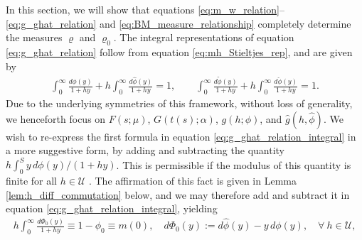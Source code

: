 \documentclass[english,12pt,jmp,graphicx]{revtex4-1}
\newcommand{\ph}{\hat{\phi}}
\newcommand{\pt}{\tilde{\phi}}
\newcommand{\pc}{\check{\phi}}
\begin{document}
In this section, we will show that equations
\eqref{eq:m_w_relation}--\eqref{eq:g_ghat_relation} and 
\eqref{eq:BM_measure_relationship} completely determine the measures
$\varrho$ and $\varrho_0$. The integral representations of equation
\eqref{eq:g_ghat_relation} follow from equation
\eqref{eq:mh_Stieltjes_rep}, and are given by  
%
\begin{align}\label{eq:g_ghat_relation_integral}
  \int_0^\infty\frac{d\phi(y)}{1+hy}+h\int_0^\infty\frac{d\ph(y)}{1+hy}=1,\qquad
  \int_0^\infty\frac{d\pt(y)}{1+hy}+h\int_0^\infty\frac{d\pc(y)}{1+hy}=1.
\end{align}
%
Due to the underlying symmetries of this framework, without loss of
generality, we henceforth focus on $F(s;\mu)$, $G(t(s);\alpha)$, $g(h;\phi)$,
and $\hat{g}(h,\ph)$. We wish to re-express the first formula in
equation \eqref{eq:g_ghat_relation_integral} in a more suggestive form,
by adding and subtracting the quantity
$h\int_0^{S}y\,d\phi(y)/(1+hy)$. This is permissible if the modulus of
this quantity is finite for all $h\in\mathcal{U}$
\cite{Rudin:87,Folland:95}. The affirmation of this fact is given in 
Lemma \ref{lem:h_diff_commutation} below, and we may therefore add and
subtract it in equation \eqref{eq:g_ghat_relation_integral}, yielding   
%
%
\begin{align}\label{eq:n=0_measure_equivalence}
 h \int_0^\infty\frac{d\Phi_0(y)}{1+hy}\equiv1-\phi_0\equiv m(0),  \quad
 d\Phi_0(y):=d\ph(y)-y\,d\phi(y), \quad
 \forall \ h\in\mathcal{U},
\end{align}
\end{document}

